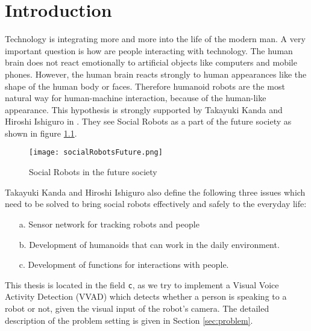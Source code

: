 \chapter{Introduction}\label{cha:Introduction}
Technology is integrating more and more into the life of the modern man. A very important
question is how are people interacting with technology.
The human brain does not react emotionally to artificial objects like computers and
mobile phones. However, the human brain reacts strongly to human appearances like
the shape of the human body or faces. Therefore humanoid robots are the most
natural way for human-machine interaction, because of the human-like appearance.
This hypothesis is strongly supported by Takayuki Kanda and Hiroshi Ishiguro in \cite{kanda2017human}.
They see Social Robots as a part of the future society as shown in figure \ref{fig:socialRobotsFuture}.
\begin{figure}
  \centering
  \texttt{[image: socialRobotsFuture.png]}
  \caption{Social Robots in the future society \cite{kanda2017human}}
  \label{fig:socialRobotsFuture}
\end{figure}
Takayuki Kanda and Hiroshi Ishiguro also define the following three issues which
need to be solved to bring social robots effectively and safely to the everyday life:
\begin{itemize}
  \item [a.] Sensor network for tracking robots and people
  \item [b.] Development of humanoids that can work in the daily environment.
  \item [c.] Development of functions for interactions with people.
\end{itemize}
This thesis is located in the field \texttt{c}, as we try to implement a Visual Voice Activity Detection (VVAD) which detects whether a person is speaking to a robot or not, given the visual input of the robot's camera. The detailed description of the problem
setting is given in Section \ref{sec:problem}.


